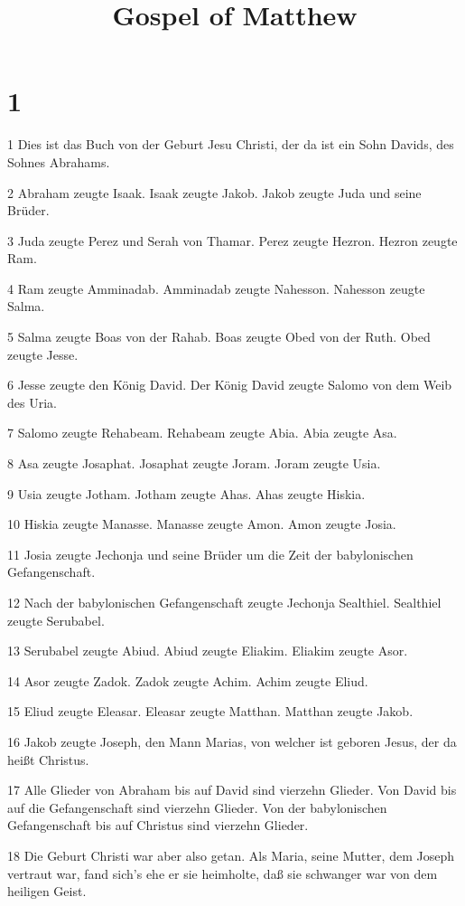 

\title{Gospel of Matthew}


\chapter{1}

\par 1 Dies ist das Buch von der Geburt Jesu Christi, der da ist ein Sohn Davids, des Sohnes Abrahams.
\par 2 Abraham zeugte Isaak. Isaak zeugte Jakob. Jakob zeugte Juda und seine Brüder.
\par 3 Juda zeugte Perez und Serah von Thamar. Perez zeugte Hezron. Hezron zeugte Ram.
\par 4 Ram zeugte Amminadab. Amminadab zeugte Nahesson. Nahesson zeugte Salma.
\par 5 Salma zeugte Boas von der Rahab. Boas zeugte Obed von der Ruth. Obed zeugte Jesse.
\par 6 Jesse zeugte den König David. Der König David zeugte Salomo von dem Weib des Uria.
\par 7 Salomo zeugte Rehabeam. Rehabeam zeugte Abia. Abia zeugte Asa.
\par 8 Asa zeugte Josaphat. Josaphat zeugte Joram. Joram zeugte Usia.
\par 9 Usia zeugte Jotham. Jotham zeugte Ahas. Ahas zeugte Hiskia.
\par 10 Hiskia zeugte Manasse. Manasse zeugte Amon. Amon zeugte Josia.
\par 11 Josia zeugte Jechonja und seine Brüder um die Zeit der babylonischen Gefangenschaft.
\par 12 Nach der babylonischen Gefangenschaft zeugte Jechonja Sealthiel. Sealthiel zeugte Serubabel.
\par 13 Serubabel zeugte Abiud. Abiud zeugte Eliakim. Eliakim zeugte Asor.
\par 14 Asor zeugte Zadok. Zadok zeugte Achim. Achim zeugte Eliud.
\par 15 Eliud zeugte Eleasar. Eleasar zeugte Matthan. Matthan zeugte Jakob.
\par 16 Jakob zeugte Joseph, den Mann Marias, von welcher ist geboren Jesus, der da heißt Christus.
\par 17 Alle Glieder von Abraham bis auf David sind vierzehn Glieder. Von David bis auf die Gefangenschaft sind vierzehn Glieder. Von der babylonischen Gefangenschaft bis auf Christus sind vierzehn Glieder.
\par 18 Die Geburt Christi war aber also getan. Als Maria, seine Mutter, dem Joseph vertraut war, fand sich's ehe er sie heimholte, daß sie schwanger war von dem heiligen Geist.
